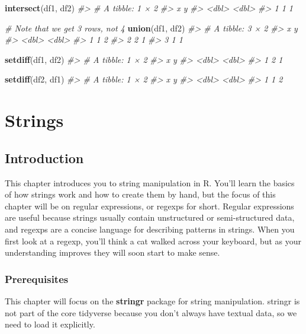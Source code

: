 \documentclass[]{book}
\newenvironment{Shaded}{\begin{snugshade}}{\end{snugshade}}
\newcommand{\KeywordTok}[1]{\textcolor[rgb]{0.13,0.29,0.53}{\textbf{{#1}}}}
\newcommand{\CommentTok}[1]{\textcolor[rgb]{0.56,0.35,0.01}{\textit{{#1}}}}
\newcommand{\NormalTok}[1]{{#1}}
\begin{document}
\begin{Shaded}
\begin{Highlighting}[]
\KeywordTok{intersect}\NormalTok{(df1, df2)}
\CommentTok{#> # A tibble: 1 × 2}
\CommentTok{#>       x     y}
\CommentTok{#>   <dbl> <dbl>}
\CommentTok{#> 1     1     1}

\CommentTok{# Note that we get 3 rows, not 4}
\KeywordTok{union}\NormalTok{(df1, df2)}
\CommentTok{#> # A tibble: 3 × 2}
\CommentTok{#>       x     y}
\CommentTok{#>   <dbl> <dbl>}
\CommentTok{#> 1     1     2}
\CommentTok{#> 2     2     1}
\CommentTok{#> 3     1     1}

\KeywordTok{setdiff}\NormalTok{(df1, df2)}
\CommentTok{#> # A tibble: 1 × 2}
\CommentTok{#>       x     y}
\CommentTok{#>   <dbl> <dbl>}
\CommentTok{#> 1     2     1}

\KeywordTok{setdiff}\NormalTok{(df2, df1)}
\CommentTok{#> # A tibble: 1 × 2}
\CommentTok{#>       x     y}
\CommentTok{#>   <dbl> <dbl>}
\CommentTok{#> 1     1     2}
\end{Highlighting}
\end{Shaded}

\hypertarget{strings}{\chapter{Strings}\label{strings}}

\section{Introduction}\label{introduction-8}

This chapter introduces you to string manipulation in R. You'll learn
the basics of how strings work and how to create them by hand, but the
focus of this chapter will be on regular expressions, or regexps for
short. Regular expressions are useful because strings usually contain
unstructured or semi-structured data, and regexps are a concise language
for describing patterns in strings. When you first look at a regexp,
you'll think a cat walked across your keyboard, but as your
understanding improves they will soon start to make sense.

\subsection{Prerequisites}\label{prerequisites-8}

This chapter will focus on the \textbf{stringr} package for string
manipulation. stringr is not part of the core tidyverse because you
don't always have textual data, so we need to load it explicitly.
\end{document}
